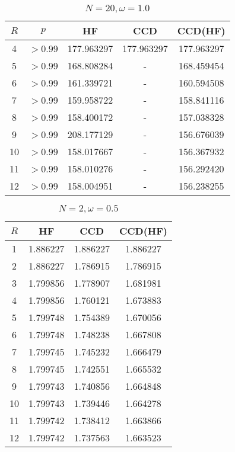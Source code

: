\begin{table}[H]
    \centering
    \caption{$N = 20, \omega = 1.0$}
    \begin{tabular}{ccccc}
    \toprule
    $R$ & $p$ & HF & CCD & CCD(HF) \\
    \midrule
    4 & $>$0.99 & 177.963297 & 177.963297 & 177.963297 \\
    5 & $>$0.99 & 168.808284 & - & 168.459454 \\
    6 & $>$0.99 & 161.339721 & - & 160.594508 \\
    7 & $>$0.99 & 159.958722 & - & 158.841116 \\
    8 & $>$0.99 & 158.400172 & - & 157.038328 \\
    9 & $>$0.99 & 208.177129 & - & 156.676039 \\
    10 & $>$0.99 & 158.017667 & - & 156.367932 \\
    11 & $>$0.99 & 158.010276 & - & 156.292420 \\
    12 & $>$0.99 & 158.004951 & - & 156.238255 \\
    \bottomrule
    \end{tabular}
\end{table}

\begin{table}[H]
    \centering
    \caption{$N = 2, \omega = 0.5$}
    \begin{tabular}{cccc}
    \toprule
    $R$ & HF & CCD & CCD(HF) \\
    \midrule
    1 & 1.886227 & 1.886227 & 1.886227 \\
    2 & 1.886227 & 1.786915 & 1.786915 \\
    3 & 1.799856 & 1.778907 & 1.681981 \\
    4 & 1.799856 & 1.760121 & 1.673883 \\
    5 & 1.799748 & 1.754389 & 1.670056 \\
    6 & 1.799748 & 1.748238 & 1.667808 \\
    7 & 1.799745 & 1.745232 & 1.666479 \\
    8 & 1.799745 & 1.742551 & 1.665532 \\
    9 & 1.799743 & 1.740856 & 1.664848 \\
    10 & 1.799743 & 1.739446 & 1.664278 \\
    11 & 1.799742 & 1.738412 & 1.663866 \\
    12 & 1.799742 & 1.737563 & 1.663523 \\
    \bottomrule
    \end{tabular}
\end{table}
    
